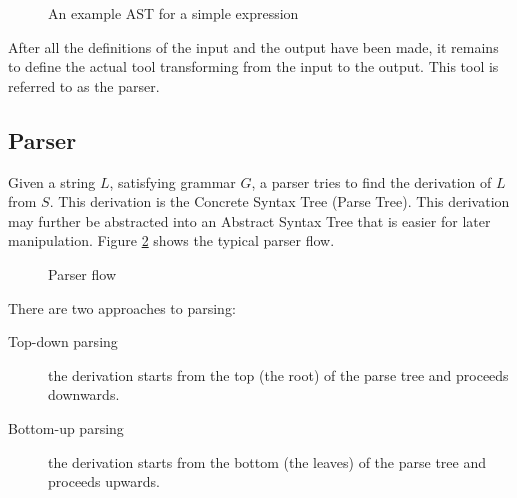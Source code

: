 \begin{figure}[hbt!]
  \centering
  \caption{An example AST for a simple expression}
  \label{fig:simple_ast}
\end{figure}

After all the definitions of the input and the output have been made,
it remains to define the actual tool transforming from the input to
the output. This tool is referred to as the parser.

\subsection{Parser}

Given a string $L$, satisfying grammar $G$, a parser tries to find the
derivation of $L$ from $S$. This derivation is the Concrete Syntax
Tree (Parse Tree). This derivation may further be abstracted into an
Abstract Syntax Tree that is easier for later manipulation. Figure
\ref{fig:parser_flow} shows the typical parser flow.

\begin{figure}[hbt!]
  \centering
  \caption{Parser flow}
  \label{fig:parser_flow}
\end{figure}

There are two approaches to parsing:
\begin{description}
\item[Top-down parsing] the derivation starts from the top (the root)
  of the parse tree and proceeds downwards.
\item[Bottom-up parsing] the derivation starts from the bottom (the
  leaves) of the parse tree and proceeds upwards.
\end{description}

